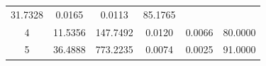 \documentclass[11pt,]{article}
\begin{document}
\begin{longtable}[]{@{}cccccc@{}}
\begin{minipage}[t]{0.25\columnwidth}
31.7328\strut
\end{minipage} & \begin{minipage}[t]{0.11\columnwidth}\centering\strut
0.0165\strut
\end{minipage} & \begin{minipage}[t]{0.14\columnwidth}\centering\strut
0.0113\strut
\end{minipage} & \begin{minipage}[t]{0.13\columnwidth}\centering\strut
85.1765\strut
\end{minipage}\tabularnewline
\begin{minipage}[t]{0.08\columnwidth}\centering\strut
4\strut
\end{minipage} & \begin{minipage}[t]{0.11\columnwidth}\centering\strut
11.5356\strut
\end{minipage} & \begin{minipage}[t]{0.25\columnwidth}\centering\strut
147.7492\strut
\end{minipage} & \begin{minipage}[t]{0.11\columnwidth}\centering\strut
0.0120\strut
\end{minipage} & \begin{minipage}[t]{0.14\columnwidth}\centering\strut
0.0066\strut
\end{minipage} & \begin{minipage}[t]{0.13\columnwidth}\centering\strut
80.0000\strut
\end{minipage}\tabularnewline
\begin{minipage}[t]{0.08\columnwidth}\centering\strut
5\strut
\end{minipage} & \begin{minipage}[t]{0.11\columnwidth}\centering\strut
36.4888\strut
\end{minipage} & \begin{minipage}[t]{0.25\columnwidth}\centering\strut
773.2235\strut
\end{minipage} & \begin{minipage}[t]{0.11\columnwidth}\centering\strut
0.0074\strut
\end{minipage} & \begin{minipage}[t]{0.14\columnwidth}\centering\strut
0.0025\strut
\end{minipage} & \begin{minipage}[t]{0.13\columnwidth}\centering\strut
91.0000\strut
\end{minipage}\tabularnewline
\bottomrule
\end{longtable}
\end{document}
